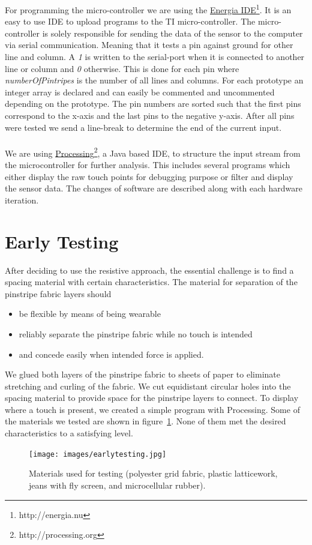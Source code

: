 For programming the micro-controller we are using the \href{http://energia.nu}{Energia IDE}\footnote{http://energia.nu}. It is an easy to use IDE to upload programs to the TI micro-controller. The micro-controller is solely responsible for sending the data of the sensor to the computer via serial communication. Meaning that it tests a pin against ground for other line and column. A \emph{1} is written to the serial-port when it is connected to another line or column and \emph{0} otherwise. This is done for each pin where \emph{numberOfPintripes} is the number of all lines and columns. For each prototype an integer array is declared and can easily be commented and uncommented depending on the prototype. The pin numbers are sorted such that the first pins correspond to the x-axis and the last pins to the negative y-axis. After all pins were tested we send a line-break to determine the end of the current input.\\ \\

We are using \href{http://processing.org}{Processing}\footnote{http://processing.org}, a Java based IDE, to structure the input stream from the microcontroller for further analysis. This includes several programs which either display the raw touch points for debugging purpose or filter and display the sensor data. The changes of software are described along with each hardware iteration. 

\section{Early Testing}
After deciding to use the resistive approach, the essential challenge is to find a spacing material with certain characteristics. The material for separation of the pinstripe fabric layers should
\begin{itemize}
\item be flexible by means of being wearable
\item reliably separate the pinstripe fabric while no touch is intended
\item and concede easily when intended force is applied.
\end{itemize}
We glued both layers of the pinstripe fabric to sheets of paper to eliminate stretching and curling of the fabric. We cut equidistant circular holes into the spacing material to provide space for the pinstripe layers to connect. To display where a touch is present, we created a simple program with Processing. Some of the materials we tested are shown in figure~\ref{fig:earlymats}. None of them met the desired characteristics to a satisfying level.
\begin{figure}
\texttt{[image: images/earlytesting.jpg]}
\caption{Materials used for testing (polyester grid fabric, plastic latticework, jeans with fly screen, and microcellular rubber).}
\label{fig:earlymats}
\end{figure}

